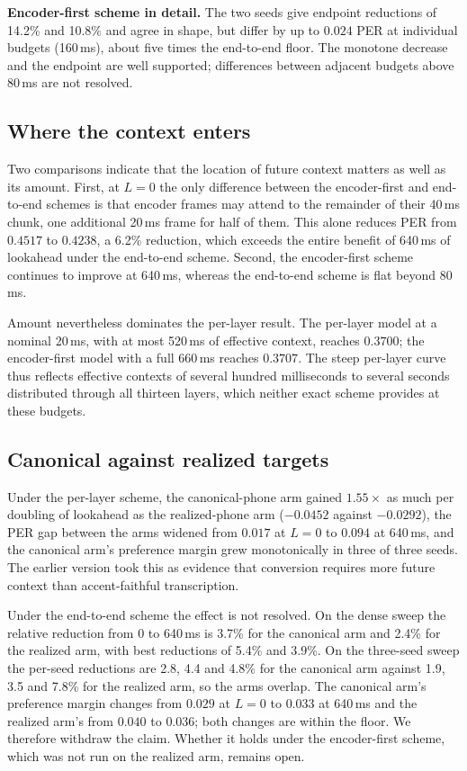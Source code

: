 \documentclass[journal]{IEEEtran}
\begin{document}
\textbf{Encoder-first scheme in detail.} The two seeds give endpoint
reductions of 14.2\% and 10.8\% and agree in shape, but differ by up to
$0.024$ PER at individual budgets (160\,ms), about five times the end-to-end
floor. The monotone decrease and the endpoint are well supported;
differences between adjacent budgets above 80\,ms are not resolved.

\subsection{Where the context enters}
\label{sec:where}

Two comparisons indicate that the location of future context matters as well
as its amount. First, at $L=0$ the only difference between the encoder-first
and end-to-end schemes is that encoder frames may attend to the remainder of
their 40\,ms chunk, one additional 20\,ms frame for half of them. This alone
reduces PER from $0.4517$ to $0.4238$, a 6.2\% reduction, which exceeds the
entire benefit of 640\,ms of lookahead under the end-to-end scheme. Second,
the encoder-first scheme continues to improve at 640\,ms, whereas the
end-to-end scheme is flat beyond 80\,ms.

Amount nevertheless dominates the per-layer result. The per-layer model at a
nominal 20\,ms, with at most 520\,ms of effective context, reaches $0.3700$;
the encoder-first model with a full 660\,ms reaches $0.3707$. The steep
per-layer curve thus reflects effective contexts of several hundred
milliseconds to several seconds distributed through all thirteen layers,
which neither exact scheme provides at these budgets.

\subsection{Canonical against realized targets}
\label{sec:rq3}

Under the per-layer scheme, the canonical-phone arm gained $1.55\times$ as much
per doubling of lookahead as the realized-phone arm ($-0.0452$ against
$-0.0292$), the PER gap between the arms widened from $0.017$ at $L=0$ to
$0.094$ at 640\,ms, and the canonical arm's preference margin grew
monotonically in three of three seeds. The earlier version took this as
evidence that conversion requires more future context than accent-faithful
transcription.

Under the end-to-end scheme the effect is not resolved. On the dense sweep the
relative reduction from 0 to 640\,ms is 3.7\% for the canonical arm and 2.4\%
for the realized arm, with best reductions of 5.4\% and 3.9\%. On the
three-seed sweep the per-seed reductions are 2.8, 4.4 and 4.8\% for the
canonical arm against 1.9, 3.5 and 7.8\% for the realized arm, so the arms
overlap. The canonical arm's preference margin changes from $0.029$ at
$L=0$ to $0.033$ at 640\,ms and the realized arm's from $0.040$ to $0.036$;
both changes are within the floor. We therefore withdraw the claim. Whether
it holds under the encoder-first scheme, which was not run on the realized
arm, remains open.
\end{document}

